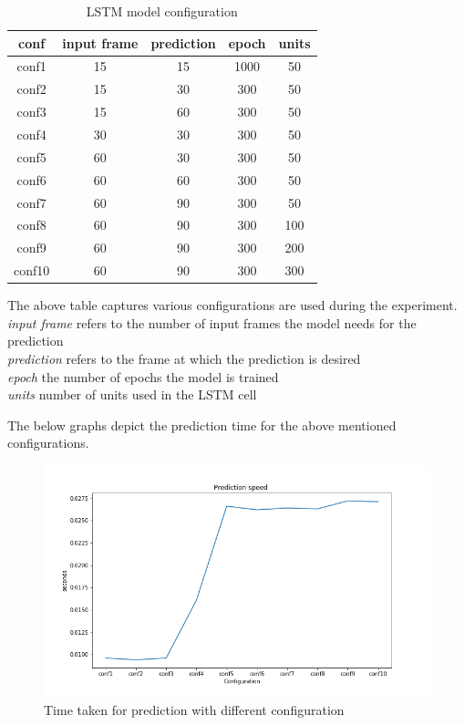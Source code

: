\begin {table}[H]
\begin{center}
 \begin{tabular}{||c c c c c||} 
 \hline
conf & input frame & prediction & epoch & units\\ [1.0ex] 
\hline\hline
conf1 & 15 & 15 & 1000 & 50 \\ 
\hline
conf2 & 15 & 30 & 300 & 50 \\ 
\hline
conf3 & 15 & 60 & 300 & 50 \\ 
\hline
conf4 & 30 & 30 & 300 & 50 \\ 
\hline
conf5 & 60 & 30 & 300 & 50 \\ 
\hline
conf6 & 60 & 60 & 300 & 50 \\ 
\hline
conf7 & 60 & 90 & 300 & 50 \\ 
\hline
conf8 & 60 & 90 & 300 & 100 \\ 
\hline
conf9 & 60 & 90 & 300 & 200 \\ 
\hline
conf10 & 60 & 90 & 300 & 300 \\ 
\hline
\end{tabular}
\caption{LSTM model configuration}
\end{center}
\end{table}
The above table captures various configurations are used during the experiment. \\
\textit{input frame} refers to the number of input frames the model needs for the prediction \\
\textit{prediction} refers to the frame at which the prediction is desired \\
\textit{epoch } the number of epochs the model is trained \\
\textit{units} number of units used in the LSTM cell

The below graphs depict the prediction time for the above mentioned configurations.

\begin{figure}[H]
\includegraphics[scale=0.8]{time-taken-for-prediction.png}
\begin{center}
\caption{Time taken for prediction with different configuration}
\end{center}
\end{figure}

